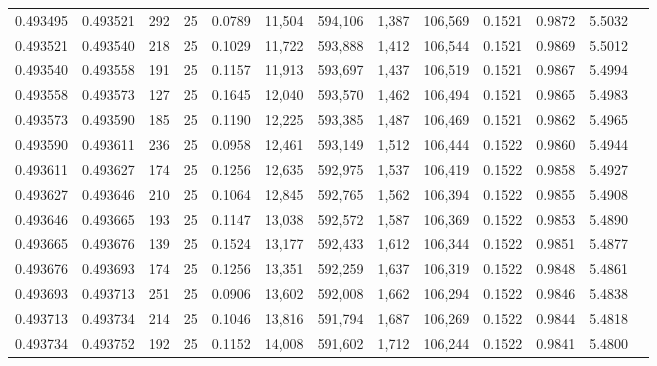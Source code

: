 \begin{tabular}{rrrrrrrrrrrrr}
0.493495 & 0.493521 & 292 &  25 &                                     0.0789 &  11,504 & 594,106 &   1,387 & 106,569 & 0.1521 & 0.9872 & 5.5032 \\
0.493521 & 0.493540 & 218 &  25 &                                     0.1029 &  11,722 & 593,888 &   1,412 & 106,544 & 0.1521 & 0.9869 & 5.5012 \\
0.493540 & 0.493558 & 191 &  25 &                                     0.1157 &  11,913 & 593,697 &   1,437 & 106,519 & 0.1521 & 0.9867 & 5.4994 \\
0.493558 & 0.493573 & 127 &  25 &                                     0.1645 &  12,040 & 593,570 &   1,462 & 106,494 & 0.1521 & 0.9865 & 5.4983 \\
0.493573 & 0.493590 & 185 &  25 &                                     0.1190 &  12,225 & 593,385 &   1,487 & 106,469 & 0.1521 & 0.9862 & 5.4965 \\
0.493590 & 0.493611 & 236 &  25 &                                     0.0958 &  12,461 & 593,149 &   1,512 & 106,444 & 0.1522 & 0.9860 & 5.4944 \\
0.493611 & 0.493627 & 174 &  25 &                                     0.1256 &  12,635 & 592,975 &   1,537 & 106,419 & 0.1522 & 0.9858 & 5.4927 \\
0.493627 & 0.493646 & 210 &  25 &                                     0.1064 &  12,845 & 592,765 &   1,562 & 106,394 & 0.1522 & 0.9855 & 5.4908 \\
0.493646 & 0.493665 & 193 &  25 &                                     0.1147 &  13,038 & 592,572 &   1,587 & 106,369 & 0.1522 & 0.9853 & 5.4890 \\
0.493665 & 0.493676 & 139 &  25 &                                     0.1524 &  13,177 & 592,433 &   1,612 & 106,344 & 0.1522 & 0.9851 & 5.4877 \\
0.493676 & 0.493693 & 174 &  25 &                                     0.1256 &  13,351 & 592,259 &   1,637 & 106,319 & 0.1522 & 0.9848 & 5.4861 \\
0.493693 & 0.493713 & 251 &  25 &                                     0.0906 &  13,602 & 592,008 &   1,662 & 106,294 & 0.1522 & 0.9846 & 5.4838 \\
0.493713 & 0.493734 & 214 &  25 &                                     0.1046 &  13,816 & 591,794 &   1,687 & 106,269 & 0.1522 & 0.9844 & 5.4818 \\
0.493734 & 0.493752 & 192 &  25 &                                     0.1152 &  14,008 & 591,602 &   1,712 & 106,244 & 0.1522 & 0.9841 & 5.4800 \\

\end{tabular}
